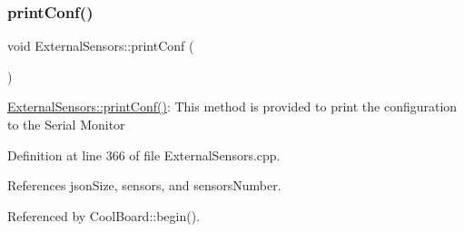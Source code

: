 \subsubsection{\texorpdfstring{print\+Conf()}{printConf()}}
{\footnotesize\ttfamily void External\+Sensors\+::print\+Conf (\begin{DoxyParamCaption}{ }\end{DoxyParamCaption})}

\hyperlink{classExternalSensors_a78c2bf55084435dd51d3c559b2d3c6f3}{External\+Sensors\+::print\+Conf()}\+: This method is provided to print the configuration to the Serial Monitor 

Definition at line 366 of file External\+Sensors.\+cpp.



References json\+Size, sensors, and sensors\+Number.



Referenced by Cool\+Board\+::begin().


